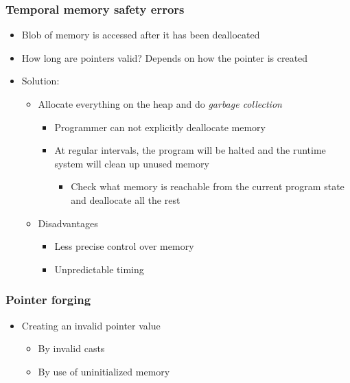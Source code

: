 \documentclass[12pt,titlepage,a4paper]{report}
\begin{document}
				\subsubsection{Temporal memory safety errors}
					\begin{itemize}
						\item Blob of memory is accessed after it has been deallocated
						\item How long are pointers valid?
							\subitem Depends on how the pointer is created
						\item Solution:
						\begin{itemize}
							\item Allocate everything on the heap and do \emph{garbage collection}
							\begin{itemize}
								\item Programmer can not explicitly deallocate memory
								\item At regular intervals, the program will be halted and the runtime system will clean up unused memory
								\begin{itemize}
									\item Check what memory is reachable from the current program state and deallocate all the rest
								\end{itemize}
							\end{itemize}
							\item Disadvantages
							\begin{itemize}
								\item Less precise control over memory
								\item Unpredictable timing
							\end{itemize}
						\end{itemize}
					\end{itemize}
				
				\subsubsection{Pointer forging}
					\begin{itemize}
						\item Creating an invalid pointer value
						\begin{itemize}
							\item By invalid casts
							\item By use of uninitialized memory
						\end{itemize}
					\end{itemize}
				
\end{document}

